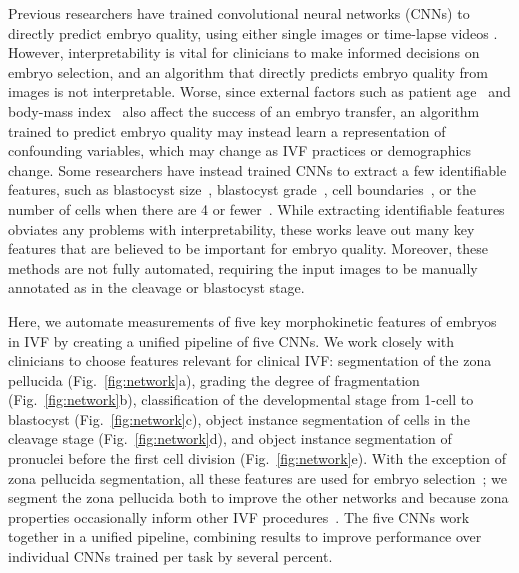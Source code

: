 Previous researchers have trained convolutional neural networks (CNNs) to directly predict embryo quality, using either single images or time-lapse videos \cite{petersen2016development,tran2019deep}. However, interpretability is vital for clinicians to make informed decisions on embryo selection, and an algorithm that directly predicts embryo quality from images is not interpretable. Worse, since external factors such as patient age~\cite{franasiak2014nature} and body-mass index~\cite{broughton2017obesity} also affect the success of an embryo transfer, an algorithm trained to predict embryo quality may instead learn a representation of confounding variables, which may change as IVF practices or demographics change. Some researchers have instead trained CNNs to extract a few identifiable features, such as blastocyst size~\cite{kheradmand2017inner}, blastocyst grade~\cite{kragh2019automatic,filho2012method,khosravi2019deep}, cell boundaries~\cite{rad2018hybrid}, or the number of cells when there are 4 or fewer~\cite{khan2016deep,lau2019embryo}. While extracting identifiable features obviates any problems with interpretability, these works leave out many key features that are believed to be important for embryo quality. Moreover, these methods are not fully automated, requiring the input images to be manually annotated as in the cleavage or blastocyst stage.

Here, we automate measurements of five key morphokinetic features of embryos in IVF by creating a unified pipeline of five CNNs. We work closely with clinicians to choose features relevant for clinical IVF: segmentation of the zona pellucida (Fig.~\ref{fig:network}a), grading the degree of fragmentation (Fig.~\ref{fig:network}b), classification of the developmental stage from 1-cell to blastocyst (Fig.~\ref{fig:network}c), object instance segmentation of cells in the cleavage stage (Fig.~\ref{fig:network}d), and object instance segmentation of pronuclei before the first cell division (Fig.~\ref{fig:network}e). With the exception of zona pellucida segmentation, all these features are used for embryo selection~\cite{alikani1999human,racowsky2011national,amir2019time,nickkho2019hydatidiform}; we segment the zona pellucida both to improve the other networks and because zona properties occasionally inform other IVF procedures~\cite{cohen1992implantation}. The five CNNs work together in a unified pipeline, combining results to improve performance over individual CNNs trained per task by several percent.

